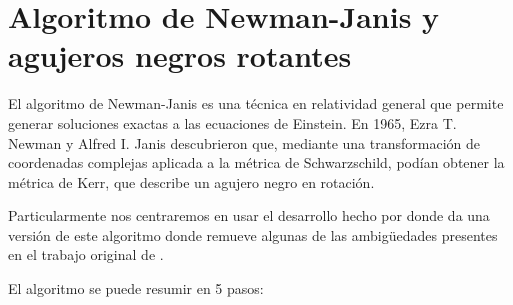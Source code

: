 
\section{Algoritmo de Newman-Janis y agujeros negros rotantes}

El algoritmo de Newman-Janis es una técnica en relatividad general que permite generar soluciones exactas a las ecuaciones de Einstein. En 1965, Ezra T. Newman y Alfred I. Janis \cite{newman-1965} descubrieron que, mediante una transformación de coordenadas complejas aplicada a la métrica de Schwarzschild, podían obtener la métrica de Kerr, que describe un agujero negro en rotación.

Particularmente nos centraremos en usar el desarrollo hecho por \cite{drake-2000} donde da una versión de este algoritmo donde remueve algunas de las ambigüedades presentes en el trabajo original de \cite{newman-1965}.

El algoritmo se puede resumir en 5 pasos:

